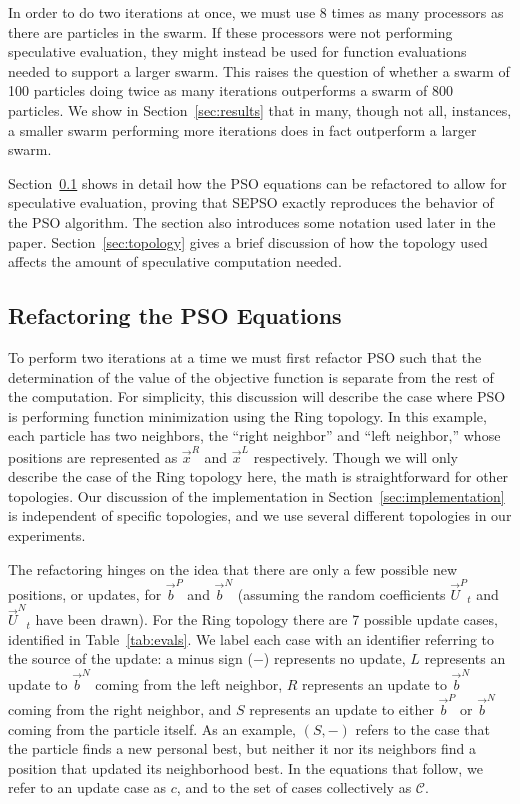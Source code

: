 \documentclass[smallcondensed]{svjour3}
\renewcommand{\sec}[1]{Section~\ref{sec:#1}}
\providecommand{\pers}{\ensuremath{P}}
\providecommand{\neigh}{\ensuremath{N}}
\providecommand{\leftind}{\ensuremath{L}}
\providecommand{\rightind}{\ensuremath{R}}
\providecommand{\nURand}{\ensuremath{\Vec{U}^\neigh}}
\providecommand{\pURand}{\ensuremath{\Vec{U}^\pers}}
\providecommand{\nbest}{\ensuremath{\Vec{b}^\neigh}}
\providecommand{\pbest}{\ensuremath{\Vec{b}^\pers}}
\providecommand{\leftn}{\ensuremath{\Vec{x}^\leftind}}
\providecommand{\rightn}{\ensuremath{\Vec{x}^\rightind}}
\providecommand{\caseset}{\ensuremath{\mathcal{C}}}
\providecommand{\casegen}{\ensuremath{c}}
\providecommand{\casexn}{\ensuremath{(S,-)}}
\begin{document}
In order to do two iterations at once, we must use 8 times as many processors
as there are particles in the swarm.  If these processors were not performing
speculative evaluation, they might instead be used for function evaluations
needed to support a larger swarm.  This raises the question of whether a swarm
of 100 particles doing twice as many iterations outperforms a swarm of 800
particles.  We show in \sec{results} that in many, though not all, instances, a
smaller swarm performing more iterations does in fact outperform a larger
swarm.

\sec{proof} shows in detail how the PSO equations can be refactored to allow
for speculative evaluation, proving that SEPSO exactly reproduces the behavior
of the PSO algorithm.  The section also introduces some notation used later in
the paper.  \sec{topology} gives a brief discussion of how the topology used
affects the amount of speculative computation needed.

\subsection{Refactoring the PSO Equations}
\label{sec:proof}

To perform two iterations at a time we must first refactor PSO such that the
determination of the value of the objective function is separate from the rest
of the computation.  For simplicity, this discussion will describe the case
where PSO is performing function minimization using the Ring topology.  In this
example, each particle has two neighbors, the ``right neighbor'' and ``left
neighbor,'' whose positions are represented as $\rightn$ and $\leftn$
respectively.  Though we will only describe the case of the Ring topology here,
the math is straightforward for other topologies.  Our discussion of the
implementation in \sec{implementation} is independent of specific topologies,
and we use several different topologies in our experiments.

The refactoring hinges on the idea that there are only a few possible new
positions, or updates, for $\pbest$ and $\nbest$ (assuming the random
coefficients $\pURand_{t}$ and $\nURand_{t}$ have been drawn).  For the Ring
topology there are 7 possible update cases, identified in
Table~\ref{tab:evals}.  We label each case with an identifier referring to the
source of the update: a minus sign ($-$) represents no update, $L$ represents
an update to $\nbest$ coming from the left neighbor, $R$ represents an update
to $\nbest$ coming from the right neighbor, and $S$ represents an update to
either $\pbest$ or $\nbest$ coming from the particle itself.  As an example,
$\casexn$ refers to the case that the particle finds a new personal best, but
neither it nor its neighbors find a position that updated its neighborhood
best.  In the equations that follow, we refer to an update case as $\casegen$,
and to the set of cases collectively as $\caseset$.
\end{document}
